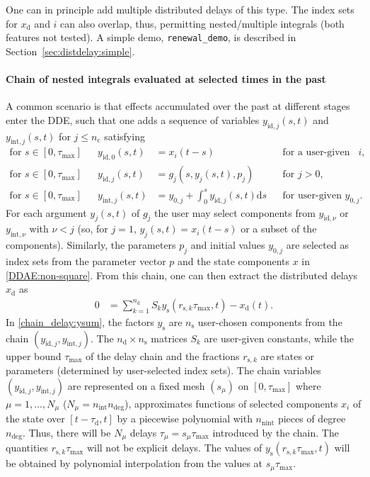 \documentclass[10pt]{scrartcl}
\renewcommand{\d}{\mathrm{d}}
\newcommand{\blist}[1]{\mbox{\lstinline!#1!}}
\begin{document}
One can in principle add multiple distributed delays of this type. The
index sets for $x_\mathrm{d}$ and $i$ can also overlap, thus,
permitting nested/multiple integrals (both features not tested). A
simple demo, \blist{renewal_demo}, is described in
Section~\ref{sec:distdelay:simple}.

\paragraph{Chain of nested integrals evaluated at selected times in the past}
A common scenario is that effects accumulated over the past at different stages enter the DDE, such that one adds a sequence of variables $y_{\mathrm{id},j}(s,t)$ and
$y_{\mathrm{int},j}(s,t)$ for $j\leq n_\mathrm{c}$ satisfying
\begin{align}
  \label{chain_delay:yid0}
  \mbox{for\ }s\in[0,\tau_{\max}]&&y_{\mathrm{id},0}(s,t)&=x_i(t-s)&&\mbox{for a user-given index set $i$,}\\
  \label{chain_delay:yid}
  \mbox{for\ }s\in[0,\tau_{\max}]&&  y_{\mathrm{id},j}(s,t)&=g_j(s,y_j(s,t),p_j)&&\mbox{for $j>0$,}\\
  \label{chain_delay:yint}
  \mbox{for\ }s\in[0,\tau_{\max}]&&  y_{\mathrm{int},j}(s,t)&=y_{0,j}+\int_0^s y_{\mathrm{id},j}(s,t)\d s&&\mbox{for user-given $y_{0,j}$.}
\end{align}
For each argument $y_j(s,t)$ of $g_j$ the user may select components
from $y_{\mathrm{id},\nu}$ or $y_{\mathrm{int},\nu}$ with $\nu<j$ (so,
for $j=1$, $y_j(s,t)=x_i(t-s)$ or a subset of the
components). Similarly, the parameters $p_j$ and initial values
$y_{0,j}$ are selected as index sets from the parameter vector $p$
and the state components $x$ in \eqref{DDAE:non-square}. From this
chain, one can then extract the distributed delays $x_\mathrm{d}$ as
\begin{align}
  \label{chain_delay:ysum}
  0&=\sum_{k=1}^{n_\mathrm{d}}S_ky_{\mathrm{s}}(r_{\mathrm{s},k}\tau_{\max},t)-x_\mathrm{d}(t).
\end{align}
In \eqref{chain_delay:ysum}, the factors $y_\mathrm{s}$ are
$n_\mathrm{s}$ user-chosen components from the chain
$(y_{\mathrm{id},j},y_{\mathrm{int},j})$. The
$n_\mathrm{d}\times n_\mathrm{s}$ matrices $S_k$ are user-given
constants, while the upper bound  $\tau_{\max}$ of the delay chain and
the fractions $r_{\mathrm{s},k}$ are states or parameters (determined
by user-selected index sets). The chain variables
$(y_{\mathrm{id},j},y_{\mathrm{int},j})$ are represented on a fixed
mesh $(s_\mu)$ on $[0,\tau_{\max}]$ where $\mu=1,\ldots,N_\mu$
($N_\mu=n_\mathrm{int}n_\mathrm{deg}$), approximates functions of
selected components $x_i$ of the state over $[t-\tau_\mathrm{d},t]$ by
a piecewise polynomial with $n_\mathrm{nint}$ pieces of degree
$n_\mathrm{deg}$. Thus, there will be $N_\mu$ delays
$\tau_\mu=s_\mu\tau_{\max}$ introduced by the chain. The quantities $r_{\mathrm{s},k}\tau_{\max}$ will not be explicit delays. The values of $y_\mathrm{s}(r_{\mathrm{s},k}\tau_{\max},t)$ will be obtained by polynomial interpolation from the values at $s_\mu\tau_{\max}$.
\end{document}
